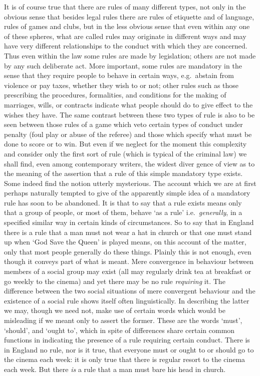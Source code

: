 It is of course true that there are rules of many different types, not
only in the obvious sense that besides legal rules there are rules of
etiquette and of language, rules of games and clubs, but in the less
obvious sense that even within any one of these spheres, what are called
rules may originate in different ways and may have very different
relationships to the conduct with which they are concerned. Thus even
within the law some rules are made by legislation; others are not made
by any such deliberate act. More important, some rules are mandatory in
the sense that they require people to behave in certain ways,
e.g.~abstain from violence or pay taxes, whether they wish to or not;
other rules such as those prescribing the procedures, formalities, and
conditions for the making of marriages, wills, or contracts indicate
what people should do to give effect to the wishes they have. The same
contrast between these two types of rule is also to be seen between
those rules of a game which veto certain types of conduct under penalty
(foul play or abuse of the referee) and those which specify what must be
done to score or to win. But even if we neglect for the moment this
complexity and consider only the first sort of rule (which is typical of
the criminal law) we shall find, even among contemporary writers, the
widest diver gence of view as to the meaning of the assertion that a
rule of this simple mandatory type exists. Some indeed find the notion
utterly mysterious. The account which we are at first perhaps naturally
tempted to give of the apparently simple idea of a mandatory rule has
soon to be abandoned. It is that to say that a rule exists means only
that a group of people, or most of them, behave `as a rule'
i.e.~\emph{generally}, in a specified similar way in certain kinds of
circumstances. So to say that in England there is a rule that a man must
not wear a hat in church or that one must stand up when `God Save the
Queen' is played means, on this account of the matter, only that most
people generally do these things. Plainly this is not enough, even
though it conveys part of what is meant. Mere convergence in behaviour
between members of a social group may exist (all may regularly drink tea
at breakfast or go weekly to the cinema) and yet there may be no rule
\emph{requiring} it. The difference between the two social situations of
mere convergent behaviour and the existence of a social rule shows
itself often linguistically. In describing the latter we may, though we
need not, make use of certain words which would be misleading if we
meant only to assert the former. These are the words `must', `should',
and `ought to', which in spite of differences share certain common
functions in indicating the presence of a rule requiring certain
conduct. There is in England no rule, nor is it true, that everyone must
or ought to or should go to the cinema each week: it is only true that
there is regular resort to the cinema each week. But there \emph{is} a
rule that a man must bare his head in church.

